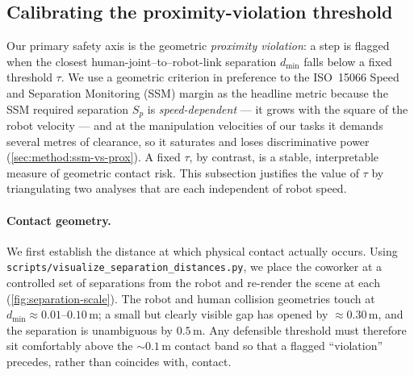 
\subsection{Calibrating the proximity-violation threshold}
\label{sec:bench:proximity-threshold}

Our primary safety axis is the geometric \emph{proximity violation}: a step is flagged
when the closest human-joint--to--robot-link separation $d_{\min}$ falls below a fixed
threshold $\tau$. We use a geometric criterion in preference to the ISO~15066 Speed and
Separation Monitoring (SSM) margin as the headline metric because the SSM required
separation $S_p$ is \emph{speed-dependent} --- it grows with the square of the robot
velocity --- and at the manipulation velocities of our tasks it demands several metres of
clearance, so it saturates and loses discriminative power (\cref{sec:method:ssm-vs-prox}).
A fixed $\tau$, by contrast, is a stable, interpretable measure of geometric contact risk.
This subsection justifies the value of $\tau$ by triangulating two analyses that are each
independent of robot speed.

\paragraph{Contact geometry.}
We first establish the distance at which physical contact actually occurs. Using
\texttt{scripts/visualize\_separation\_distances.py}, we place the coworker at a controlled
set of separations from the robot and re-render the scene at each
(\cref{fig:separation-scale}). The robot and human collision geometries touch at
$d_{\min}\!\approx\!0.01$--$0.10$\,m; a small but clearly visible gap has opened by
$\approx\!0.30$\,m, and the separation is unambiguous by $0.5$\,m. Any defensible threshold
must therefore sit comfortably above the $\sim\!0.1$\,m contact band so that a flagged
``violation'' precedes, rather than coincides with, contact.

